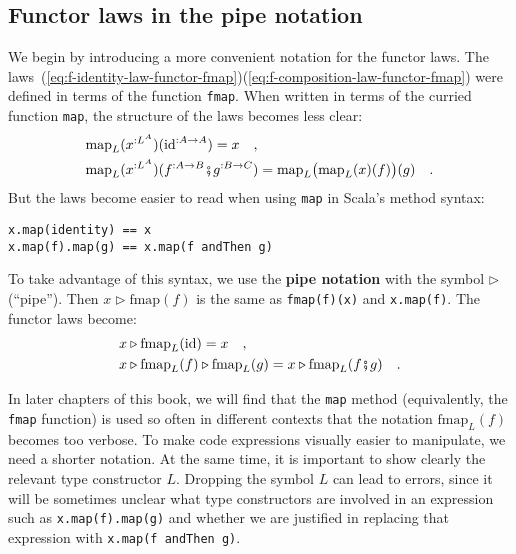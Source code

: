 \subsection{Functor laws in the pipe notation}

We begin by introducing a more convenient notation for the functor
laws. The laws~(\ref{eq:f-identity-law-functor-fmap})\textendash (\ref{eq:f-composition-law-functor-fmap})
were defined in terms of the function \lstinline!fmap!. When written
in terms of the curried function \lstinline!map!, the structure of
the laws becomes less clear:
\begin{align*}
 & \text{map}_{L}(x^{:L^{A}})(\text{id}^{:A\rightarrow A})=x\quad,\\
 & \text{map}_{L}(x^{:L^{A}})(f^{:A\rightarrow B}\bef g^{:B\rightarrow C})=\text{map}_{L}\big(\text{map}_{L}(x)(f)\big)(g)\quad.
\end{align*}
But the laws become easier to read when using \lstinline!map! in
Scala\textsf{'}s method syntax:
\begin{lstlisting}
x.map(identity) == x
x.map(f).map(g) == x.map(f andThen g)
\end{lstlisting}
To take advantage of this syntax, we use the \textbf{pipe
notation} with the symbol $\triangleright$ (\textsf{``}pipe\textsf{''}). Then $x\triangleright\text{fmap}(f)$
is the same as \lstinline!fmap(f)(x)! and \lstinline!x.map(f)!.
The functor laws become:
\begin{align*}
 & x\triangleright\text{fmap}_{L}(\text{id})=x\quad,\\
 & x\triangleright\text{fmap}_{L}(f)\triangleright\text{fmap}_{L}(g)=x\triangleright\text{fmap}_{L}(f\bef g)\quad.
\end{align*}

In later chapters of this book, we will find that the \lstinline!map!
method (equivalently, the \lstinline!fmap! function) is used so often
in different contexts that the notation $\text{fmap}_{L}(f)$ becomes
too verbose. To make code expressions visually easier to manipulate,
we need a shorter notation. At the same time, it is important to show
clearly the relevant type constructor $L$. Dropping the symbol $L$
can lead to errors, since it will be sometimes unclear what type constructors
are involved in an expression such as \lstinline!x.map(f).map(g)!
and whether we are justified in replacing that expression with \lstinline!x.map(f andThen g)!.

